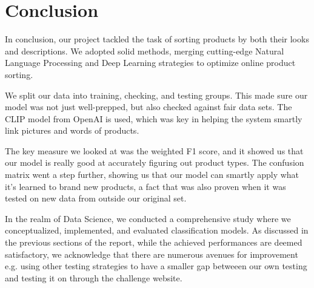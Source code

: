 \chapter{Conclusion}
\label{sec:conclusion}

In conclusion, our project tackled the task of sorting products by both their looks and descriptions. We adopted solid methods, merging cutting-edge Natural Language Processing and Deep Learning strategies to optimize online product sorting.

We split our data into training, checking, and testing groups. This made sure our model was not just well-prepped, but also checked against fair data sets. The CLIP model from OpenAI is used, which was key in helping the system smartly link pictures and words of products.

The key measure we looked at was the weighted F1 score, and it showed us that our model is really good at accurately figuring out product types. The confusion matrix went a step further, showing us that our model can smartly apply what it's learned to brand new products, a fact that was also proven when it was tested on new data from outside our original set.

In the realm of Data Science, we conducted a comprehensive study where we conceptualized, implemented, and evaluated classification models. As discussed in the previous sections of the report, while the achieved performances are deemed satisfactory, we acknowledge that there are numerous avenues for improvement e.g. using other testing strategies to have a smaller gap betweeen our own testing and testing it on through the challenge website.






